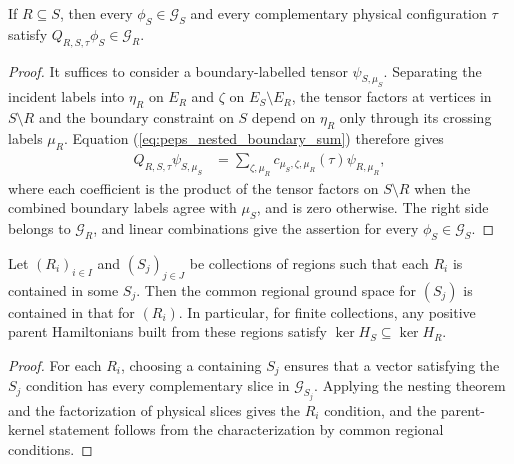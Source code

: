 \begin{lemma}%
    \label{thm:peps_region_ground_space_nested}
    \leanok
    If $R\subseteq S$, then every $\phi_S\in\mathcal G_S$ and
    every complementary physical configuration $\tau$ satisfy
    $Q_{R,S,\tau}\phi_S\in\mathcal G_R$.
\end{lemma}

\begin{proof}\leanok
    It suffices to consider a boundary-labelled tensor
    $\psi_{S,\mu_S}$. Separating the incident labels into
    $\eta_R$ on $E_R$ and $\zeta$ on $E_S\setminus E_R$,
    the tensor factors at vertices in $S\setminus R$ and the boundary
    constraint on $S$ depend on $\eta_R$ only through its
    crossing labels $\mu_R$. Equation
    (\ref{eq:peps_nested_boundary_sum}) therefore gives
    \begin{align}
        Q_{R,S,\tau}\psi_{S,\mu_S}
         & =\sum_{\zeta,\mu_R}
        c_{\mu_S,\zeta,\mu_R}(\tau)\psi_{R,\mu_R},
        \label{eq:peps_nested_contraction}
    \end{align}
    where each coefficient is the product of the tensor factors
    on $S\setminus R$ when the combined boundary labels agree
    with $\mu_S$, and is zero otherwise. The right side belongs
    to $\mathcal G_R$, and linear combinations give the assertion
    for every $\phi_S\in\mathcal G_S$.
\end{proof}

\begin{lemma}%
    \label{thm:peps_parent_regions_monotonicity}
    \leanok
    Let $(R_i)_{i\in I}$ and $(S_j)_{j\in J}$ be collections of
    regions such that each $R_i$ is contained in some $S_j$.
    Then the common regional ground space for $(S_j)$ is contained
    in that for $(R_i)$. In particular, for finite collections,
    any positive parent Hamiltonians built from these regions
    satisfy $\ker H_S\subseteq\ker H_R$.
\end{lemma}

\begin{proof}\leanok
    For each $R_i$, choosing a containing $S_j$ ensures that a vector satisfying
    the $S_j$ condition has every complementary slice in
    $\mathcal G_{S_j}$. Applying the nesting theorem and the
    factorization of physical slices gives the $R_i$
    condition, and the parent-kernel statement follows from the
    characterization by common regional conditions.
\end{proof}

